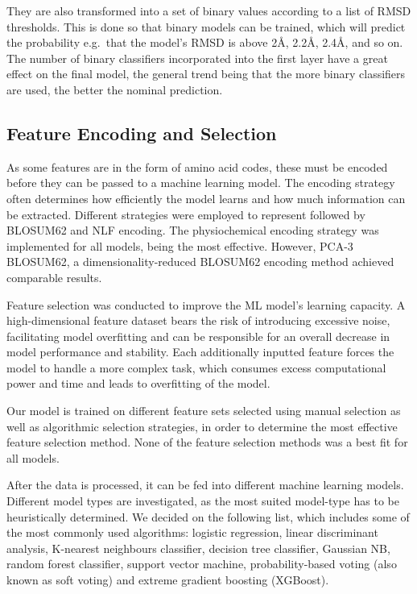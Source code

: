 \documentclass[12pt]{article}
\begin{document}
They are also transformed into a set of binary values according to a
list of RMSD thresholds. This is done so that binary models can be
trained, which will predict the probability e.g.\ that the model's RMSD
is above 2\AA, 2.2\AA, 2.4\AA, and so on. The number of binary
classifiers incorporated into the first layer have a great effect on
the final model, the general trend being that the more binary
classifiers are used, the better the nominal prediction.

\subsection{Feature Encoding and Selection}

As some features are in the form of amino acid codes, these must be
encoded before they can be passed to a machine learning model. The
encoding strategy often determines how efficiently the model learns
and how much information can be extracted. Different strategies were
employed to represent followed by BLOSUM62 and NLF encoding. The
physiochemical encoding strategy was implemented for all models, being
the most effective. However, PCA-3 BLOSUM62, a dimensionality-reduced
BLOSUM62 encoding method achieved comparable results.

Feature selection was conducted to improve the ML model's learning
capacity. A high-dimensional feature dataset bears the risk of
introducing excessive noise, facilitating model overfitting and can be
responsible for an overall decrease in model performance and
stability. Each additionally inputted feature forces the model to
handle a more complex task, which consumes excess computational power
and time and leads to overfitting of the model.

Our model is trained on different feature sets selected using manual
selection as well as algorithmic selection strategies, in order to
determine the most effective feature selection method. None of the
feature selection methods was a best fit for all models.

After the data is processed, it can be fed into different machine
learning models. Different model types are investigated, as the most
suited model-type has to be heuristically determined. We decided on
the following list, which includes some of the most commonly used
algorithms: logistic regression, linear discriminant analysis,
K-nearest neighbours classifier, decision tree classifier, Gaussian
NB, random forest classifier, support vector machine,
probability-based voting (also known as soft voting) and extreme
gradient boosting (XGBoost)\cite{Chen2016}.
\end{document}
